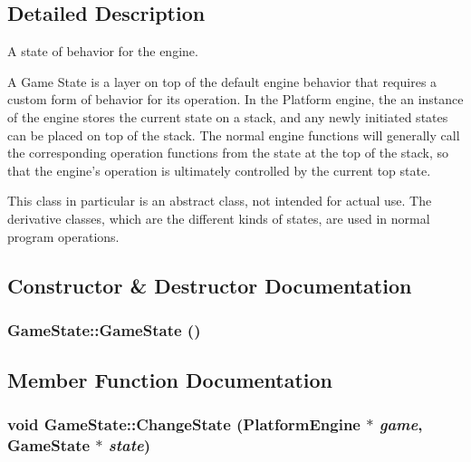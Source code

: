 \subsection{Detailed Description}
A state of behavior for the engine. 

A Game State is a layer on top of the default engine behavior that requires a custom form of behavior for its operation. In the Platform engine, the an instance of the engine stores the current state on a stack, and any newly initiated states can be placed on top of the stack. The normal engine functions will generally call the corresponding operation functions from the state at the top of the stack, so that the engine's operation is ultimately controlled by the current top state.

This class in particular is an abstract class, not intended for actual use. The derivative classes, which are the different kinds of states, are used in normal program operations. 

\subsection{Constructor \& Destructor Documentation}
\hypertarget{class_game_state_4fa0a2bf50315c4a35a3890a0adcee5c}{
\subsubsection[{GameState}]{\setlength{\rightskip}{0pt plus 5cm}GameState::GameState ()}}
\label{dd/d87/class_game_state_4fa0a2bf50315c4a35a3890a0adcee5c}




\subsection{Member Function Documentation}
\hypertarget{class_game_state_f786aeb704a22a135dc289bb89fcc452}{
\subsubsection[{ChangeState}]{\setlength{\rightskip}{0pt plus 5cm}void GameState::ChangeState ({\bf PlatformEngine} $\ast$ {\em game}, \/  {\bf GameState} $\ast$ {\em state})}}
\label{dd/d87/class_game_state_f786aeb704a22a135dc289bb89fcc452}


